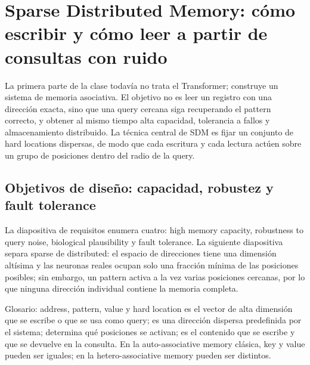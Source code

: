 \section{Sparse Distributed Memory: cómo escribir y cómo leer a partir de consultas con ruido}

La primera parte de la clase todavía no trata el Transformer; construye un sistema de memoria asociativa. El objetivo no es leer un registro con una dirección exacta, sino que una query cercana siga recuperando el pattern correcto, y obtener al mismo tiempo alta capacidad, tolerancia a fallos y almacenamiento distribuido. La técnica central de SDM es fijar un conjunto de hard locations dispersas, de modo que cada escritura y cada lectura actúen sobre un grupo de posiciones dentro del radio de la query.

\subsection{Objetivos de diseño: capacidad, robustez y fault tolerance}

La diapositiva de requisitos enumera cuatro: high memory capacity, robustness to query noise, biological plausibility y fault tolerance. La siguiente diapositiva separa sparse de distributed: el espacio de direcciones tiene una dimensión altísima y las neuronas reales ocupan solo una fracción mínima de las posiciones posibles; sin embargo, un pattern activa a la vez varias posiciones cercanas, por lo que ninguna dirección individual contiene la memoria completa.



\begin{knowledgebox}{Glosario: address, pattern, value y hard location}
 es el vector de alta dimensión que se escribe o que se usa como query;  es una dirección dispersa predefinida por el sistema;  determina qué posiciones se activan;  es el contenido que se escribe y que se devuelve en la consulta. En la auto-associative memory clásica, key y value pueden ser iguales; en la hetero-associative memory pueden ser distintos.
\end{knowledgebox}

